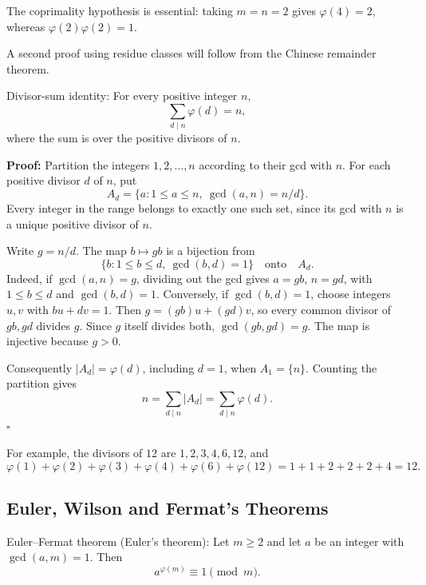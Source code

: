 \documentclass[a4paper,11pt,abstracton]{scrartcl}
\theoremstyle{dotlessP}
\theoremstyle{dotlessS}
\theoremstyle{remark}
\theoremstyle{definition}
\begin{document}
\begin{example_box}
The coprimality hypothesis is essential: taking $m=n=2$ gives
$\varphi(4)=2$, whereas $\varphi(2)\varphi(2)=1$.
\end{example_box}

A second proof using residue classes will follow from the Chinese
remainder theorem.

\begin{mainbox}{Divisor-sum identity:}
For every positive integer $n$,
\[
    \boxed{\sum_{d\mid n}\varphi(d)=n,}
\]
where the sum is over the positive divisors of $n$.
\end{mainbox}

\textbf{Proof:}
Partition the integers $1,2,\ldots,n$ according to their gcd with $n$.
For each positive divisor $d$ of $n$, put
\[
    A_d=\{a:1\leq a\leq n,\ \gcd(a,n)=n/d\}.
\]
Every integer in the range belongs to exactly one such set, since
its gcd with $n$ is a unique positive divisor of $n$.

Write $g=n/d$. The map $b\mapsto gb$ is a bijection from
\[
    \{b:1\leq b\leq d,\ \gcd(b,d)=1\}
    \quad\text{onto}\quad A_d.
\]
Indeed, if $\gcd(a,n)=g$, dividing out the gcd gives
$a=gb$, $n=gd$, with $1\leq b\leq d$ and $\gcd(b,d)=1$.
Conversely, if $\gcd(b,d)=1$, choose integers $u,v$ with $bu+dv=1$.
Then $g=(gb)u+(gd)v$, so every common divisor of $gb,gd$ divides $g$.
Since $g$ itself divides both, $\gcd(gb,gd)=g$.
The map is injective because $g>0$.

Consequently $|A_d|=\varphi(d)$, including $d=1$, when $A_1=\{n\}$.
Counting the partition gives
\[
    n=\sum_{d\mid n}|A_d|=\sum_{d\mid n}\varphi(d).
\]
\hfill$\square$



\begin{example_box}
For example, the divisors of $12$ are $1,2,3,4,6,12$, and
\[
    \varphi(1)+\varphi(2)+\varphi(3)+\varphi(4)+\varphi(6)+\varphi(12)
    =1+1+2+2+2+4=12.
\]
\end{example_box}


\subsection{Euler, Wilson and Fermat's Theorems}

\begin{mainbox}{Euler--Fermat theorem (Euler's theorem):}
Let $m\geq2$ and let $a$ be an integer with $\gcd(a,m)=1$. Then
\[
    \boxed{a^{\varphi(m)}\equiv1\pmod m.}
\]
\end{mainbox}
\end{document}
